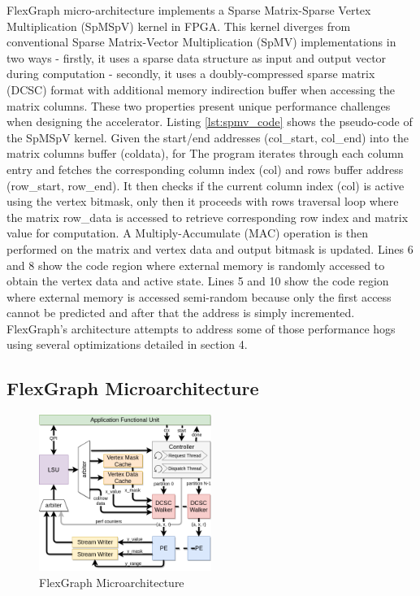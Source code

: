 FlexGraph micro-architecture implements a Sparse Matrix-Sparse Vertex Multiplication (SpMSpV) kernel in FPGA. This kernel diverges from conventional Sparse Matrix-Vector Multiplication (SpMV) implementations in two ways - firstly, it uses a sparse data structure as input and output vector during computation - secondly, it uses a doubly-compressed sparse matrix (DCSC) format with additional memory indirection buffer when accessing the matrix columns. These two properties present unique performance challenges when designing the accelerator. Listing \ref{lst:spmv_code} shows the pseudo-code of the SpMSpV kernel. Given the start/end addresses (col\_start, col\_end) into the matrix columns buffer (coldata), for The program iterates through each column entry and fetches the corresponding column index (col) and rows buffer address (row\_start, row\_end). It then checks if the current column index (col) is active using the vertex bitmask, only then it proceeds with rows traversal loop where the matrix row\_data is accessed to retrieve corresponding row index and matrix value for computation. A Multiply-Accumulate (MAC) operation is then performed on the matrix and vertex data and output bitmask is updated. Lines 6 and 8 show the code region where external memory is randomly accessed to obtain the vertex data and active state. Lines 5 and 10 show the code region where external memory is accessed semi-random because only the first access cannot be predicted and after that the address is simply incremented. FlexGraph's architecture attempts to address some of those performance hogs using several optimizations detailed in section 4.

\subsection{FlexGraph Microarchitecture}

\begin{figure}[htbp]
\centering
\includegraphics[width=0.5\textwidth]{figures/microarchitecture}
\caption{FlexGraph Microarchitecture}
\label{fig:microarchitecture}
\end{figure}

